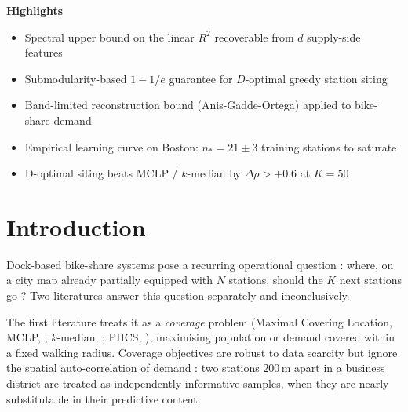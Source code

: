 \documentclass[11pt,a4paper]{article}
\newcommand{\1}{\mathbb{1}}
\theoremstyle{plain}
\theoremstyle{definition}
\theoremstyle{remark}
\newenvironment{highlights}{%
  \par\noindent\textbf{\large Highlights}\par\smallskip
  \begin{itemize}[leftmargin=1.4em,itemsep=0.15em,topsep=0.2em]}{%
  \end{itemize}\par\medskip}
\begin{document}
\begin{abstract}
\paragraph{Scope and contribution boundary.}
Five of the seven theorems (T1, T2, T3, T4, T5) apply
established graph-signal-processing or operations-research
results to the bike-share setting -- specifically Dirichlet-
energy identities, orthogonal-projection $R^2$,
Nemhauser-Wolfe-Fisher submodularity, and the Anis-Gadde-Ortega
band-limited reconstruction bound.  Their contribution is one
of systematic application.  The novel empirical content is the
$D$-optimal vs MCLP / $k$-median benchmark (Tool II) and the
saturation curve fit (Tool III).

\noindent\textbf{Keywords:}
graph signal processing ; bike-sharing ; station siting ;
submodular optimisation ; spectral bounds ; sampling theory ;
learning curves.
\end{abstract}

\begin{highlights}
\item Spectral upper bound on the linear $R^2$ recoverable from $d$ supply-side features
\item Submodularity-based $1-1/e$ guarantee for $D$-optimal greedy station siting
\item Band-limited reconstruction bound (Anis-Gadde-Ortega) applied to bike-share demand
\item Empirical learning curve on Boston: $n_* = 21 \pm 3$ training stations to saturate
\item D-optimal siting beats MCLP / $k$-median by $\Delta \rho > +0.6$ at $K = 50$
\end{highlights}

\section{Introduction}
\label{sec:intro}

Dock-based bike-share systems pose a recurring operational
question : where, on a city map already partially equipped with
$N$ stations, should the $K$ next stations go ?  Two literatures
answer this question separately and inconclusively.

The first literature treats it as a \emph{coverage} problem
(Maximal Covering Location, MCLP, \citealp{ChurchReVelle1974};
$k$-median, \citealp{Hakimi1964}; PHCS,
\citealp{Lin2013}), maximising population
or demand covered within a fixed walking radius.  Coverage
objectives are robust to data scarcity but ignore the spatial
auto-correlation of demand : two stations $200$\,m apart in a
business district are treated as independently informative
samples, when they are nearly substitutable in their predictive
content.
\end{document}
